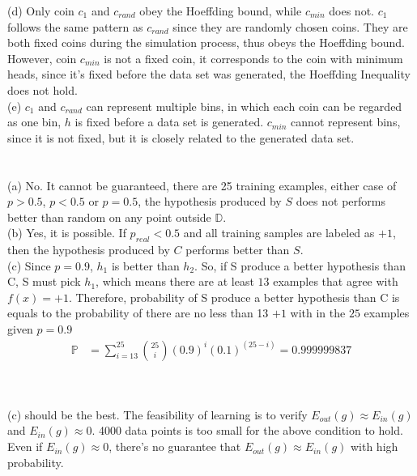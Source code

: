 \documentclass[12pt]{article}
\begin{document}
\indent (d) Only coin $c_1$ and $c_{rand}$ obey the Hoeffding bound, while $c_{min}$ does not. $c_1$ follows the same pattern as $c_{rand}$ since they are randomly chosen coins. They are both fixed coins during the simulation process, thus obeys the Hoeffding bound. However, coin $c_{min}$ is not a fixed coin, it corresponds to the coin with minimum heads, since it's fixed before the data set was generated, the Hoeffding Inequality does not hold.\\
\indent (e) $c_1$ and $c_{rand}$ can represent multiple bins, in which each coin can be regarded as one bin, $h$ is fixed before a data set is generated. $c_{min}$ cannot represent bins, since it is not fixed, but it is closely related to the generated data set.\\

 \\\\
\indent (a) No. It cannot be guaranteed, there are 25 training examples, either case of  $p > 0.5 $, $p < 0.5$ or $p = 0.5$, the hypothesis produced by $S$ does not performs better than random on any point outside $\mathbb{D}$.\\
\indent (b) Yes, it is possible. If $p_{real} < 0.5$ and all training samples are labeled as $+1$, then the hypothesis produced by $C$ performs better than $S$.\\
\indent (c) Since $p = 0.9$, $h_1$ is better than $h_2$. So, if S produce a better hypothesis than C, S must pick $h_1$, which means there are at least $13$ examples that agree with $f(x) = +1$. Therefore, probability of S produce a better hypothesis than C is equals to the probability of there are no less than 13 $+1$ with in the $25$ examples given $p = 0.9$
\begin{align*}
	\mathbb{P} & =\sum_{i = 13}^{25} {25 \choose i}(0.9)^i(0.1)^{(25-i)} = 0.999999837
\end{align*}

 \\\\
\indent (c) should be the best. The feasibility of learning is to verify $E_{out}(g) \approx E_{in}(g)$ and $E_{in}(g) \approx 0$. 4000 data points is too small for the above condition to hold. Even if $E_{in}(g) \approx 0$, there's no guarantee that $E_{out}(g) \approx E_{in}(g)$ with high probability.\\
\end{document}
